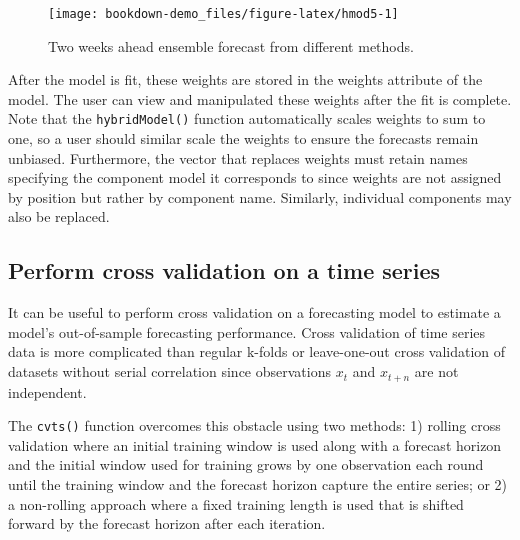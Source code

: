 \documentclass[]{book}
\newenvironment{Shaded}{\begin{snugshade}}{\end{snugshade}}
\newcommand{\OperatorTok}[1]{\textcolor[rgb]{0.81,0.36,0.00}{\textbf{#1}}}
\newcommand{\NormalTok}[1]{#1}
\begin{document}
\begin{figure}

{\centering \texttt{[image: bookdown-demo\_files/figure-latex/hmod5-1]} 

}

\caption{Two weeks ahead ensemble forecast from different methods.}\label{fig:hmod5}
\end{figure}

After the model is fit, these weights are stored in the weights
attribute of the model. The user can view and manipulated these weights
after the fit is complete. Note that the \texttt{hybridModel()} function
automatically scales weights to sum to one, so a user should similar
scale the weights to ensure the forecasts remain unbiased. Furthermore,
the vector that replaces weights must retain names specifying the
component model it corresponds to since weights are not assigned by
position but rather by component name. Similarly, individual components
may also be replaced.

\begin{Shaded}
\end{Shaded}

\subsection{Perform cross validation on a time
series}\label{perform-cross-validation-on-a-time-series}

It can be useful to perform cross validation on a forecasting model to
estimate a model's out-of-sample forecasting performance. Cross
validation of time series data is more complicated than regular k-folds
or leave-one-out cross validation of datasets without serial correlation
since observations \(x_t\) and \(x_{t+n}\) are not independent.

The \texttt{cvts()} function overcomes this obstacle using two methods:
1) rolling cross validation where an initial training window is used
along with a forecast horizon and the initial window used for training
grows by one observation each round until the training window and the
forecast horizon capture the entire series; or 2) a non-rolling approach
where a fixed training length is used that is shifted forward by the
forecast horizon after each iteration.
\end{document}
